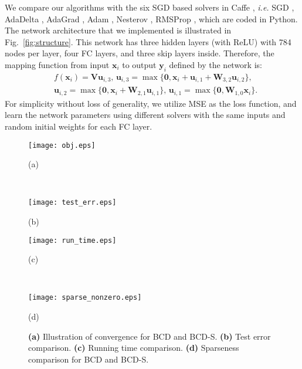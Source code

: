 \documentclass{article}
\def\ie{\emph{i.e. }}
\begin{document}
We compare our algorithms with the six SGD based solvers in Caffe \cite{jia2014caffe}, \ie SGD \cite{bottou2012stochastic}, AdaDelta \cite{zeiler2012adadelta}, AdaGrad \cite{duchi2011adaptive}, Adam \cite{kingma2014adam}, Nesterov \cite{sutskever2013importance}, RMSProp \cite{tieleman2012lecture}, which are coded in Python. The network architecture that we implemented is illustrated in Fig.~\ref{fig:structure}. This network has three hidden layers (with ReLU) with 784 nodes per layer, four FC layers, and three skip layers inside. %
Therefore, the mapping function from input $\mathbf{x}_i$ to output $\mathbf{y}_i$ defined by the network is:
\begin{align}
& f(\mathbf{x}_i) = \mathbf{V}\mathbf{u}_{i,3}, \, \mathbf{u}_{i,3} = \max\{\mathbf{0}, \mathbf{x}_i+\mathbf{u}_{i,1}+\mathbf{W}_{3,2}\mathbf{u}_{i,2}\}, \nonumber \\
& \mathbf{u}_{i,2}=\max\{\mathbf{0}, \mathbf{x}_i+\mathbf{W}_{2,1}\mathbf{u}_{i,1}\}, \, \mathbf{u}_{i,1}=\max\{\mathbf{0}, \mathbf{W}_{1,0}\mathbf{x}_i\}. \nonumber
\end{align}
For simplicity without loss of generality, we utilize MSE as the loss function, and learn the network parameters using different solvers with the same inputs and random initial weights for each FC layer. 

\begin{figure}
\centering
    \begin{minipage}[b]{0.49\linewidth}
    \centering
        \texttt{[image: obj.eps]}
        \centerline{\footnotesize (a)}
    \end{minipage}
    ~ %
    \begin{minipage}[b]{0.49\linewidth}
    \centering
        \texttt{[image: test\_err.eps]}
        \centerline{\footnotesize (b)}
    \end{minipage}  
    \begin{minipage}[b]{0.49\linewidth}
    \centering
        \texttt{[image: run\_time.eps]}
        \centerline{\footnotesize (c)}
    \end{minipage}
    ~ %
    \begin{minipage}[b]{0.49\linewidth}
    \centering
        \texttt{[image: sparse\_nonzero.eps]}
        \centerline{\footnotesize (d)}
    \end{minipage}  
    \vspace{-5mm}
    \caption{\footnotesize {\bf (a)} Illustration of convergence for BCD and BCD-S. {\bf (b)} Test error comparison. {\bf (c)} Running time comparison. {\bf (d)} Sparseness comparison for BCD and BCD-S.}\label{fig:error}
    \vspace{-4mm}
\end{figure} 
\end{document}
